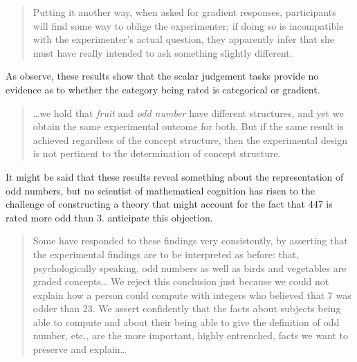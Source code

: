 \begin{quote}
Putting it another way, when asked for gradient responses, participants will find some way to oblige the experimenter; if doing so is incompatible with the experimenter's actual question, they apparently infer that she must have really intended to ask something slightly different. \citep[24]{Schutze2011}
\end{quote}

As \citeauthor{Armstrong1983} observe, these results show that the scalar judgement tasks provide no evidence as to whether the category being rated is categorical or gradient.

\begin{quote}
\ldots{}we hold that \emph{fruit} and \emph{odd number} have different structures, and yet we obtain the same experimental outcome for both. But if the same result is achieved regardless of the concept structure, then the experimental design is not pertinent to the determination of concept structure. \citep[284--5]{Armstrong1983}
\end{quote}

It might be said that these results reveal something about the representation of odd numbers, but no scientist of mathematical cognition has risen to the challenge of constructing a theory that might account for the fact that 447 is rated more odd than 3. 
\citeauthor{Armstrong1983} anticipate this objection. 

\begin{quote}
Some have responded to these findings very consistently, by asserting that the experimental findings are to be interpreted as before: that, psychologically speaking, odd numbers as well as birds and vegetables are graded concepts\ldots{} We reject this conclusion just because we could not explain how a person could compute with integers who believed that 7 was odder than 23. We assert confidently that the facts about subjects being able to compute and about their being able to give the definition of odd number, etc., are the more important, highly entrenched, facts we want to preserve and explain\ldots{} \citep[284]{Armstrong1983}
\end{quote}

